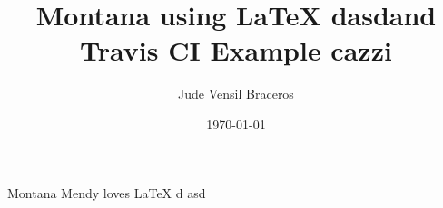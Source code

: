 \documentclass{article}
\title{Montana using LaTeX dasdand Travis CI Example cazzi}
\author{Jude Vensil Braceros}
\date{\today}
\begin{document}
\maketitle

Montana Mendy loves LaTeX d asd
\end{document}
